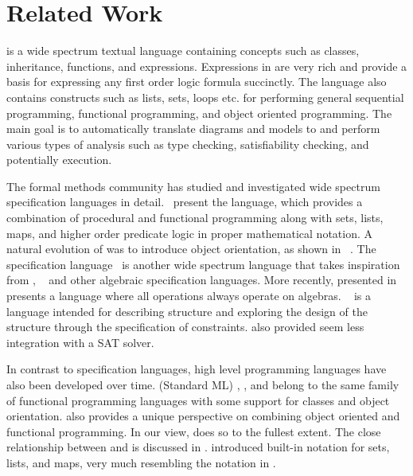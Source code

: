 \section{Related Work}
\label{sec:related-work}

\Klang{} is a wide spectrum textual language containing concepts such
as classes, inheritance, functions, and expressions. Expressions in
\Klang{} are very rich and provide a basis for expressing any first
order logic formula succinctly. The language also contains constructs
such as lists, sets, loops etc. for performing general sequential
programming, functional programming, and object oriented
programming. The main goal is to automatically translate \sysml{}
diagrams and models to \Klang{} and perform various types of analysis
such as type checking, satisfiability checking, and potentially
execution.

The formal methods community has studied and investigated wide
spectrum specification languages in
detail.~\cite{vdm78,bjoerner-jones-82,jones90,jones-shaw-90} present
the \vdm{} language, which provides a combination of procedural and
functional programming along with sets, lists, maps, and higher order
predicate logic in proper mathematical notation. A natural evolution
of \vdm{} was to introduce object orientation, as shown in
\vdmpp{}~\cite{vdmplusplus05}. The \raiselang{} specification
language~\cite{raise92} is another wide spectrum language that takes
inspiration from \vdm{}, \zlang{}~\cite{spivey-Z-1988} and other
algebraic specification languages. More recently, \asml{} presented
in~\cite{asml05} presents a language where all operations always
operate on algebras. \alloy{}~\cite{jackson-alloy-12} is a language
intended for describing structure and exploring the design of the
structure through the specification of constraints. \alloy{} also
provided seem less integration with a SAT solver. 

In contrast to specification languages, high level programming
languages have also been developed over time. \sml{} (Standard ML)
\cite{standard-ml-97}, \ocaml{} \cite{ocaml}, and \haskell{}
\cite{haskell} belong to the same family of functional programming
languages with some support for classes and object
orientation.\python{} \cite{python} also provides a unique perspective
on combining object oriented and functional programming. In our view,
\scala{} \cite{scala} does so to the fullest extent. The close
relationship between \scala{} and \vdm{} is discussed in
\cite{havelund-scala-vdm-12}.  \fortress{} \cite{fortress} introduced
built-in notation for sets, lists, and maps, very much resembling the
notation in \vdm{}.

